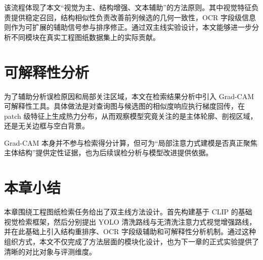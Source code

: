该流程体现了本文“视觉为主、结构增强、文本辅助”的方法原则。其中视觉特征负责提供稳定召回，结构相似性负责改善前列候选的几何一致性，OCR 字段级信息则作为可扩展的辅助信号参与排序修正。通过双主线实验设计，本文能够进一步分析不同模块在真实工程图纸数据集上的实际贡献。

\section{可解释性分析}

为了辅助分析误检原因和局部关注区域，本文在检索结果分析中引入 Grad-CAM 可解释性工具。具体做法是对查询图与候选图的相似度响应执行梯度回传，在 patch 级特征上生成热力分布，从而观察模型究竟关注的是主体轮廓、剖视区域，还是无关边框与空白背景。

Grad-CAM 本身并不参与检索得分计算，但可为“局部注意力式建模是否真正聚焦主体结构”提供定性证据，也为后续误检分析与模型改进提供依据。

\section{本章小结}

本章围绕工程图纸检索任务给出了双主线方法设计。首先构建基于 CLIP 的基础视觉检索框架，然后分别提出 YOLO 清洗路线与无清洗注意力式视觉增强路线，并在此基础上引入结构重排序、OCR 字段级辅助和可解释性分析机制。通过这种组织方式，本文不仅完成了方法层面的模块化设计，也为下一章的正式实验提供了清晰的对比对象与评测维度。
